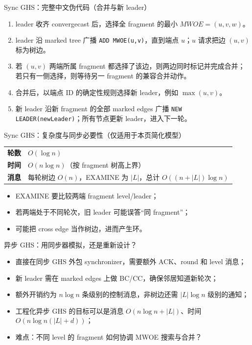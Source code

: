\documentclass[UTF8,fontset=none,aspectratio=169,10pt]{beamer}
\begin{document}
{\begin{frame}{Sync GHS：完整中文伪代码（合并与新 leader）}
\scriptsize
\begin{enumerate}
  \item leader 收齐 convergecast 后，选择全 fragment 的最小 $MWOE=(u,v,w)$。
  \item leader 沿 marked tree 广播 \texttt{ADD MWOE(u,v)}，直到端点 $u$；$u$ 请求把边 $(u,v)$ 标为树边。
  \item 若 $(u,v)$ 两端所属 fragment 都选择了该边，则两边同时标记并完成合并；若只有一侧选择，则等待另一 fragment 的兼容合并动作。
  \item 合并后，以端点 ID 的确定性规则选择新 leader，例如 $\max(u,v)$。
  \item 新 leader 沿新 fragment 的全部 marked edges 广播 \texttt{NEW LEADER(newLeader)}；所有节点更新 leader，进入下一轮。
\end{enumerate}
\normalsize
\vfill
{}
\end{frame}

\begin{frame}{Sync GHS：复杂度与同步必要性（仅适用于本页简化模型）}
\begin{tabularx}{\linewidth}{>{\bfseries}p{3.3cm}X}
\toprule
轮数 & $O(\log n)$ \\
时间 & $O(n\log n)$（按 fragment 树高上界） \\
消息 & 每轮树边 $O(n)$，EXAMINE 为 $|L|$，总计 $O((n+|L|)\log n)$ \\
\bottomrule
\end{tabularx}
\vfill
\begin{itemize}
  \item EXAMINE 要比较两端 fragment level/leader；
  \item 若两端处于不同轮次，旧 leader 可能误答“同 fragment”；
  \item 可能把 cross edge 当作树边，进而产生环。
\end{itemize}
\end{frame}

\begin{frame}{异步 GHS：用同步器模拟，还是重新设计？}
\begin{itemize}
  \item 直接在同步 GHS 外包 synchronizer，需要额外 ACK、round 和 level 消息；
  \item 新 leader 需在 marked edges 上做 BC/CC，确保邻居知道新轮次；
  \item 额外开销约为 $n\log n$ 条级别的控制消息，非树边还需 $|L|\log n$ 级别的通知；
  \item 工程化异步 GHS 的目标可以是消息 $O(n\log n+|L|)$、时间 $O(n\log n(|L|+d))$；
  \item 难点：不同 level 的 fragment 如何协调 MWOE 搜索与合并？
\end{itemize}
\end{frame}

}
\end{document}
